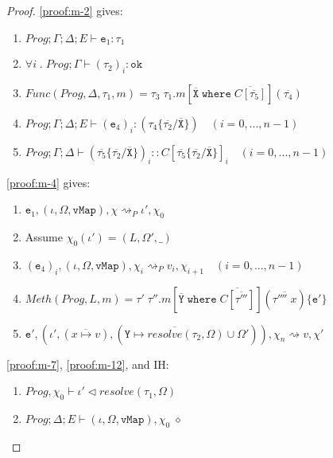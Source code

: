 \begin{proof}
\ref{proof:m-2} gives:
\begin{enumerate}[label=\arabic*), resume]
    \item \label{proof:m-7} $Prog; \Gamma; \Delta; E \vdash \texttt{e}_1 : \tau_1$
    \item \label{proof:m-8} $\forall i \; . \; Prog; \Gamma \vdash (\tau_2)_i : \texttt{ok}$
    \item \label{proof:m-9} $Func(Prog, \Delta, \tau_1, m) = \tau_3 \; \tau_1.m[\overline{\texttt{X}} \; \texttt{where} \; \overline{C[\overline{\tau_5}]}](\overline{\tau_4})$
    \item \label{proof:m-10} $Prog; \Gamma; \Delta; E \vdash (\texttt{e}_4)_i : (\tau_4 \{\overline{\tau_2}/\overline{\texttt{X}}\}) \quad (i = 0, ..., n-1)$
    \item \label{proof:m-11} $Prog; \Gamma; \Delta \vdash (\overline{\tau_5}\{\overline{\tau_2}/\overline{\texttt{X}}\})_i :: C[\overline{\tau_5}\{\overline{\tau_2}/\overline{\texttt{X}}\}]_i  \quad (i = 0, ..., n-1)$
\end{enumerate}
\ref{proof:m-4} gives:
\begin{enumerate}[label=\arabic*), resume]
    \item \label{proof:m-12} $\texttt{e}_1, (\iota, \Omega, \texttt{vMap}), \chi \rightsquigarrow_P \iota', \chi_0$ 
    \item \label{proof:m-13} Assume $\chi_0(\iota') = (L, \Omega', \_)$
    \item \label{proof:m-14} $(\texttt{e}_4)_i, (\iota, \Omega, \texttt{vMap}), \chi_i \rightsquigarrow_P v_i, \chi_{i+1}  \quad (i = 0, ..., n-1)$
    \item \label{proof:m-15} $Meth(Prog, L, m) = \tau' \; \tau''.m[\overline{\texttt{Y}} \; \texttt{where} \; \overline{C[\overline{\tau'''}]}](\overline{\tau'''' \; x})\{\texttt{e}'\}$
    \item \label{proof:m-16} $\texttt{e}', (\iota', (\overline{x \mapsto v}), (\overline{\texttt{Y} \mapsto resolve(\tau_2, \Omega)} \cup \Omega')), \chi_n \rightsquigarrow v, \chi'$
\end{enumerate}
\ref{proof:m-7}, \ref{proof:m-12}, and IH:
\begin{enumerate}[label=\arabic*), resume]
    \item \label{proof:m-17} $Prog, \chi_0 \vdash \iota' \triangleleft resolve(\tau_1, \Omega)$ 
    \item \label{proof:m-18} $Prog; \Delta; E \vdash (\iota, \Omega, \texttt{vMap}), \chi_0 \; \diamond$ 

\end{enumerate}
\end{proof}

